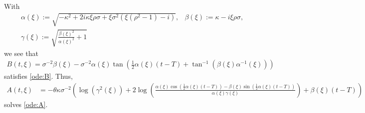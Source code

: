 \documentclass[12pt]{book}
\numberwithin{equation}{chapter}
\theoremstyle{plain}
\numberwithin{theorem}{section}
\theoremstyle{definition}
\numberwithin{exercise}{chapter}
\newcommand{\<}{\langle}
\renewcommand{\>}{\rangle}
\renewcommand{\(}{\left(}
\renewcommand{\)}{\right)}
\renewcommand{\[}{\left[}
\renewcommand{\]}{\right]}
\begin{document}
With 
\begin{align}
&\alpha(\xi)
	:= \sqrt{-\kappa ^2+2 i \kappa  \xi  \rho  \sigma +\xi  \sigma ^2 \left(\xi  \left(\rho ^2-1\right)-i\right)},
&\beta(\xi)
	:= \kappa - i \xi  \rho  \sigma, \\
&\gamma(\xi)
	:= \sqrt{\frac{\beta (\xi )^2}{\alpha (\xi )^2}+1}
\end{align}
we see that 
\begin{align}
B(t,\xi)
	= \sigma ^{-2}\beta (\xi )-\sigma ^{-2}\alpha (\xi ) 
	\tan \left(\frac{1}{2} \alpha (\xi ) (t-T)+\tan ^{-1}\left(\beta(\xi)\alpha^{-1} (\xi )\right)\right)
\end{align}
satisfies \eqref{ode:B}. Thus,
\begin{align}
A(t,\xi)
	&=
	-\theta  \kappa \sigma ^{-2} 
	\left(\log \left(\gamma^2(\xi) \right)
	+2 \log \left(
	\frac{\alpha (\xi ) \cos \left(\frac{1}{2} \alpha (\xi ) (t-T)\right)-\beta (\xi ) \sin \left(\frac{1}{2} \alpha (\xi ) (t-T)\right)
	}{\alpha (\xi ) \gamma(\xi) }\right)+\beta (\xi ) (t-T)\right)
\end{align}
solves \eqref{ode:A}.
\end{document}

